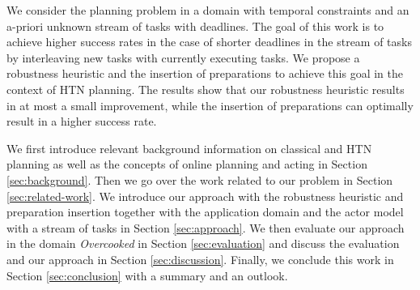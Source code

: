 We consider the planning problem in a domain with temporal constraints and an a-priori unknown stream of tasks with deadlines.
The goal of this work is to achieve higher success rates in the case of shorter deadlines in the stream of tasks by interleaving new tasks with currently executing tasks.
We propose a robustness heuristic and the insertion of preparations to achieve this goal in the context of \ac{HTN} planning.
The results show that our robustness heuristic results in at most a small improvement, while the insertion of preparations can optimally result in a higher success rate.

We first introduce relevant background information on classical and \ac{HTN} planning as well as the concepts of online planning and acting in Section \ref{sec:background}.
Then we go over the work related to our problem in Section \ref{sec:related-work}.
We introduce our approach with the robustness heuristic and preparation insertion together with the application domain and the actor model with a stream of tasks in Section \ref{sec:approach}.
We then evaluate our approach in the domain \textit{Overcooked} in Section \ref{sec:evaluation} and discuss the evaluation and our approach in Section \ref{sec:discussion}.
Finally, we conclude this work in Section \ref{sec:conclusion} with a summary and an outlook.
